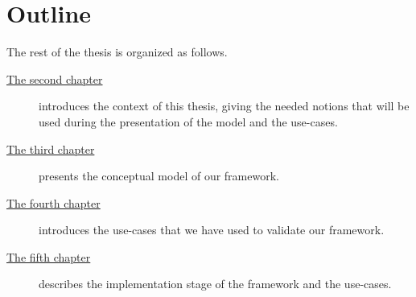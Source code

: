 \section{Outline}
The rest of the thesis is organized as follows.
\begin{description}
	\item[{\hyperref[cap:bg]{The second chapter}}] introduces the context of this
	thesis, giving the needed notions that will be used during the presentation
	of the model and the use-cases.

	\item[{\hyperref[cap:model]{The third chapter}}] presents the conceptual model
	of our framework.

	\item[{\hyperref[cap:cases]{The fourth chapter}}] introduces the use-cases
	that we have used to validate our framework.

	\item[{\hyperref[cap:implementation]{The fifth chapter}}] describes the
	implementation stage of the framework and the use-cases.
\end{description}